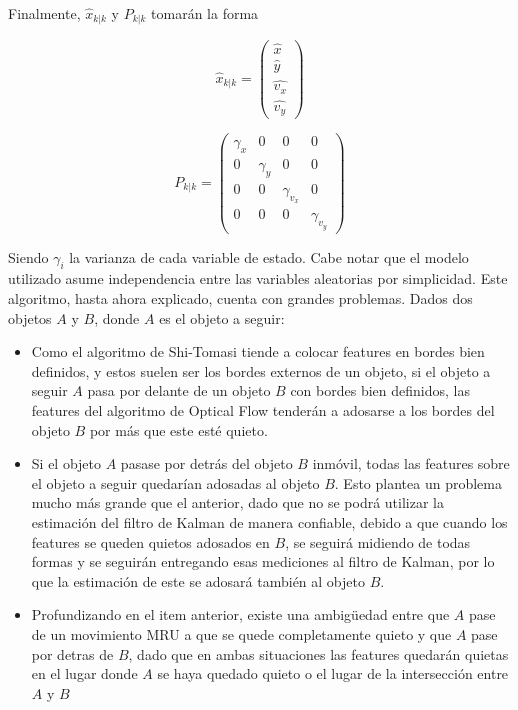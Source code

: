 Finalmente, $\hat{x}_{k|k}$ y $P_{k|k}$ tomarán la forma

\begin{equation}
\hat{x}_{k|k} = 
\begin{pmatrix}
\hat{x}\\
\hat{y}\\
\hat{v_x}\\
\hat{v_y}
\end{pmatrix}
\end{equation}

\begin{equation}
P_{k|k} = 
\begin{pmatrix}
\gamma_{x} & 0 & 0  & 0\\
0 & \gamma_{y}  & 0 & 0\\
0 & 0  & \gamma_{v_x}  & 0\\
0 & 0  & 0  & \gamma_{v_y} 
\end{pmatrix}
\end{equation}

Siendo $\gamma_{i}$ la varianza de cada variable de estado. Cabe notar que el modelo utilizado asume independencia entre las variables aleatorias por simplicidad.
Este algoritmo, hasta ahora explicado, cuenta con grandes problemas. Dados dos objetos $A$ y $B$, donde $A$ es el objeto a seguir:

\begin{itemize}
\item Como el algoritmo de Shi-Tomasi tiende a colocar features en bordes bien definidos, y estos suelen ser los bordes externos de un objeto, si el objeto a seguir $A$ pasa por delante de un objeto $B$ con bordes bien definidos, las features del algoritmo de Optical Flow tenderán a adosarse a los bordes del objeto $B$ por más que este esté quieto.
\item Si el objeto $A$ pasase por detrás del objeto $B$ inmóvil, todas las features sobre el objeto a seguir quedarían adosadas al objeto $B$. Esto plantea un problema mucho más grande que el anterior, dado que no se podrá utilizar la estimación del filtro de Kalman de manera confiable, debido a que cuando los features se queden quietos adosados en $B$, se seguirá midiendo de todas formas y se seguirán entregando esas mediciones al filtro de Kalman, por lo que la estimación de este se adosará también al objeto $B$.
\item Profundizando en el item anterior, existe una ambigüedad entre que $A$ pase de un movimiento MRU a que se quede completamente quieto y que $A$ pase por detras de $B$, dado que en ambas situaciones las features quedarán quietas en el lugar donde $A$ se haya quedado quieto o el lugar de la intersección entre $A$ y $B$
\end{itemize}

